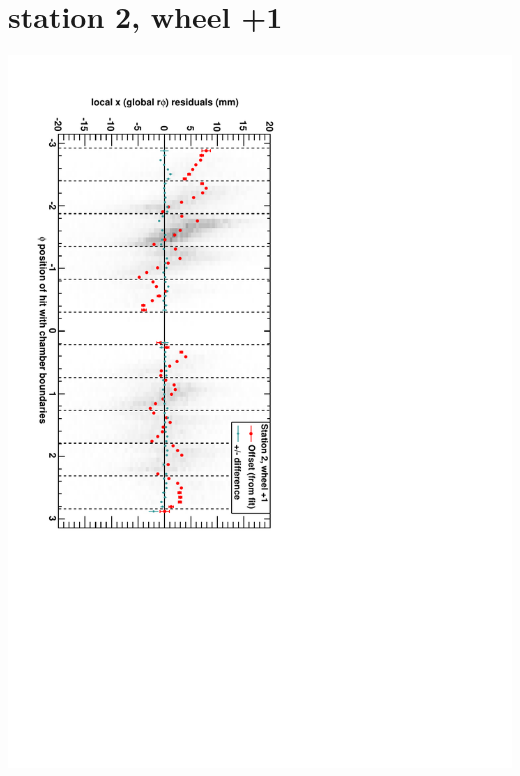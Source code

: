 \documentclass[compress]{beamer}
\begin{document}
\section*{station 2, wheel +1}
\begin{frame} \vfill \mbox{\hspace{-1 cm}\includegraphics[height=1.2\linewidth, angle=90]{DTrphiVsPhi_st2_whD.pdf}} \end{frame}
\end{document}
